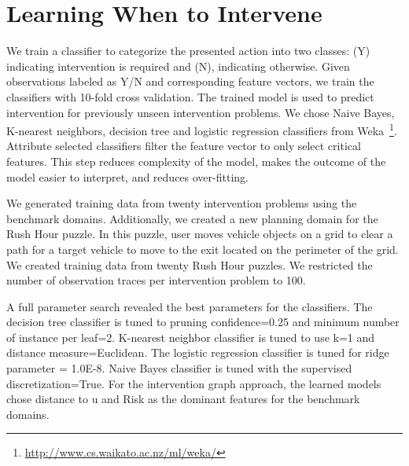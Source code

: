 \documentclass[doctor]{thesis} %
\theoremstyle{plain}
\begin{document}
\section*{Learning When to Intervene}
We train a classifier to categorize the presented action into two classes: (Y) indicating intervention is required and (N), indicating otherwise. Given observations labeled as Y/N and corresponding feature vectors, we train the classifiers with 10-fold cross validation. The trained model is used to predict intervention for previously unseen intervention problems. We chose Naive Bayes, K-nearest neighbors, decision tree and logistic regression classifiers from Weka~\footnote{\url{http://www.cs.waikato.ac.nz/ml/weka/}}. Attribute selected classifiers filter the feature vector to only select critical features. This step reduces complexity of the model, makes the outcome of the model easier to interpret, and reduces over-fitting.

We generated training data from twenty intervention problems using the benchmark domains. Additionally, we created a new planning domain for the Rush Hour puzzle. In this puzzle, user moves vehicle objects on a grid to clear a path for a target vehicle to move to the exit located on the perimeter of the grid. We created training data from twenty Rush Hour puzzles. We restricted the number of observation traces per intervention problem to 100.
 
A full parameter search revealed the best parameters for the classifiers. The decision tree classifier is tuned to pruning confidence=0.25 and minimum number of instance per leaf=2. K-nearest neighbor classifier is tuned to use k=1 and distance measure=Euclidean. The logistic regression classifier is tuned for ridge parameter = 1.0E-8. Naive Bayes classifier is tuned with the supervised discretization=True. For the intervention graph approach, the learned models chose distance to $\mathrm{u}$ and Risk as the dominant features for the benchmark domains. 
\end{document}
